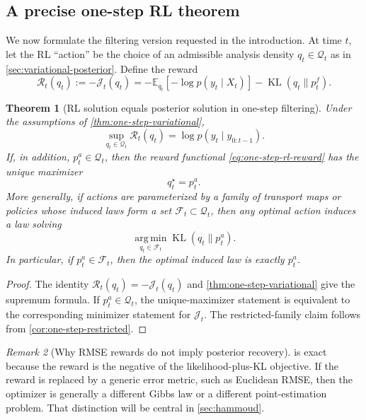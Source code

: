 \documentclass[11pt]{article}
\newcommand{\E}{\mathbb{E}}
\newcommand{\KL}{\operatorname{KL}}
\newcommand{\argmin}{\operatorname*{arg\,min}}
\newcommand{\bracks}[1]{\left[ #1 \right]}
\newcommand{\mc}{\mathcal}
\numberwithin{equation}{section}
\theoremstyle{plain}
\newtheorem{theorem}{Theorem}[section]
\theoremstyle{definition}
\theoremstyle{remark}
\newtheorem{remark}[theorem]{Remark}
\begin{document}
\subsection{A precise one-step RL theorem}

We now formulate the filtering version requested in the introduction. At time $t$, let the RL ``action'' be the choice of an admissible analysis density $q_t\in\mc Q_t$ as in \cref{sec:variational-posterior}. Define the reward
\begin{equation}
\mc R_t(q_t)
:=
-\mc J_t(q_t)
=
-\E_{q_t}\!\bracks{-\log p(y_t\mid X_t)}
-\KL(q_t\|p_t^f).
\label{eq:one-step-rl-reward}
\end{equation}

\begin{theorem}[RL solution equals posterior solution in one-step filtering]
\label{thm:rl-one-step}
Under the assumptions of \cref{thm:one-step-variational},
\begin{equation}
\sup_{q_t\in\mc Q_t}\mc R_t(q_t)=\log p(y_t\mid y_{0:t-1}).
\end{equation}
If, in addition, $p_t^a\in\mc Q_t$, then the reward functional \cref{eq:one-step-rl-reward} has the unique maximizer
\begin{equation}
q_t^\star = p_t^a.
\end{equation}
More generally, if actions are parameterized by a family of transport maps or policies whose induced laws form a set $\mc F_t\subset\mc Q_t$, then any optimal action induces a law solving
\begin{equation}
\argmin_{q_t\in \mc F_t}\KL(q_t\|p_t^a).
\end{equation}
In particular, if $p_t^a\in\mc F_t$, then the optimal induced law is exactly $p_t^a$.
\end{theorem}

\begin{proof}
The identity $\mc R_t(q_t)=-\mc J_t(q_t)$ and \cref{thm:one-step-variational} give the supremum formula. If $p_t^a\in\mc Q_t$, the unique-maximizer statement is equivalent to the corresponding minimizer statement for $\mc J_t$. The restricted-family claim follows from \cref{cor:one-step-restricted}.
\end{proof}

\begin{remark}[Why RMSE rewards do not imply posterior recovery]
\label{rem:rmse-insufficient}
 is exact because the reward is the negative of the likelihood-plus-KL objective. If the reward is replaced by a generic error metric, such as Euclidean RMSE, then the optimizer is generally a different Gibbs law or a different point-estimation problem. That distinction will be central in \cref{sec:hammoud}.
\end{remark}
\end{document}
